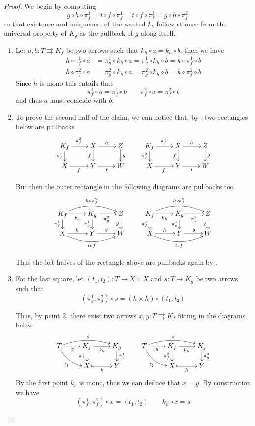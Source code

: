 \documentclass[3p]{elsarticle}
\theoremstyle{remark}
\theoremstyle{definition}
\begin{document}
\kpp*
\begin{proof}\label{kpp-proof}
	We begin by computing 
	\[g \circ h \circ \pi_f^1 =  t \circ f \circ \pi_f^1     =  t \circ f \circ \pi_f^2     =  g \circ h \circ \pi_f^2\]
	so that  existence  and uniqueness of the wanted $k_h$ follow at once from the universal property of $K_g$ as the pullback of $g$ along itself.
	
	
	\begin{enumerate}
		\item Let $a,b\colon T\rightrightarrows K_f$ be two arrows such that $k_h\circ a=k_h\circ b$, then we have
\begin{align*}h\circ \pi^1_f\circ a&=\pi^1_g\circ k_h\circ a=\pi^1_g\circ k_h\circ b=h\circ \pi^1_f\circ b\\
	h\circ \pi^2_f\circ a&=\pi^2_g\circ k_h\circ a=\pi^2_g\circ k_h\circ b=h\circ \pi^2_f\circ b
\end{align*}
Since $h$ is mono this entails that
\[	\pi^1_f\circ a=\pi^1_f\circ b \qquad \pi^2_f\circ a=\pi^2_f\circ b\]
and thus $a$ must coincide with $b$.
 
 		\item  
		To prove the second half of the claim, we can notice that, by ,  two rectangles below are pullbacks
		\[\xymatrix@R=15pt{K_f \ar[r]^{\pi^2_f} \ar[d]_{\pi^1_f} & X \ar[r]^{h} \ar[d]_{f} & Z \ar[d]^{g} &  K_f \ar[r]^{\pi^1_f} \ar[d]_{\pi^2_f} & X \ar[r]^{h} \ar[d]_{f} & Z \ar[d]^{g}\\
			X \ar[r]_{f}& Y \ar[r]_{t} & W & X \ar[r]_{f} & Y  \ar[r]_{t}& W}\]
		
		But then the outer rectangle in the  following diagrams are pullbacks too
		\[\xymatrix@R=15pt{	K_f  \ar@/^.4cm/[rr]^{h\circ\pi^2_f}\ar[r]_{k_h} \ar[d]_{\pi^1_f}& K_g \ar[d]_{\pi^1_g}  \ar[r]_{\pi^2_g}& Z \ar[d]_{g} & K_f  \ar@/^.4cm/[rr]^{h\circ\pi^2_f}\ar[r]_{k_h} \ar[d]_{\pi^1_f}& K_g \ar[d]_{\pi^1_g}  \ar[r]_{\pi^2_g}& Z \ar[d]_{g} \\
			X \ar[r]^{h} \ar@/_.4cm/[rr]_{t\circ f}& Y \ar[r]^{g} & W & X \ar[r]^{h} \ar@/_.4cm/[rr]_{t\circ f}& Y \ar[r]^{g} & W}\]
		
		Thus the left halves of the rectangle above are pullbacks again by .   
	
		
		\item 		For the last square, let $(t_1, t_2)\colon T\to X\times X$ and $s\colon T\to K_g$ be two arrows such that
		\[(\pi^1_g, \pi^2_g)\circ s=(h\times h)\circ (t_1, t_2)\]
		
		Thus, by point $2$, there exist two arrows $x, y\colon T\rightrightarrows K_f$ fitting in the diagrams below
		\[\xymatrix@R=15pt{T\ar@{.>}[r]_-{x} \ar@/^.3cm/[rr]^{s} \ar@/_.3cm/[dr]_{t_1}& K_f \ar@{->}[r]_{k_h} \ar[d]_{\pi^1_f} & K_g \ar[d]^{\pi^1_g} & T \ar@{.>}[r]_-{y} \ar@/^.3cm/[rr]^{s} \ar@/_.3cm/[dr]_{t_2} & K_f  \ar@{->}[r]_{k_h} \ar[d]_{\pi^2_f}& K_g \ar[d]^{\pi^2_g}\\ & X \ar@{>->}[r]_{h} & Y &&X \ar@{>->}[r]_{h}& Y} \]
		By the first point $k_h$ is mono, thus we can deduce that $x=y$. By construction we have
		\[(\pi^1_f, \pi^2_f)\circ x=(t_1, t_2) \qquad k_h\circ x=s\] 
				

\end{enumerate}
\end{proof}
\end{document}

